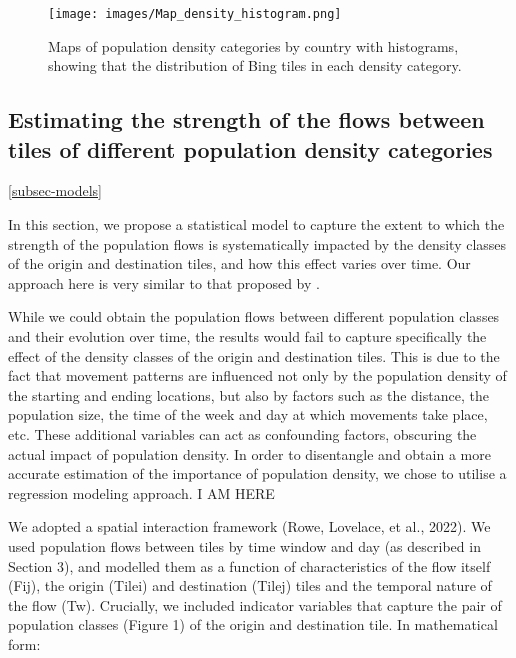\documentclass[11pt,letterpaper]{article}
\begin{document}
\begin{figure}

{\centering \texttt{[image: images/Map\_density\_histogram.png]}

}

\caption{Maps of population density categories by country with
histograms, showing that the distribution of Bing tiles in each density
category.}

\end{figure}

\subsection{Estimating the strength of the flows between tiles of different population density categories}

\ref{subsec-models}

In this section, we propose a statistical model to capture the extent to
which the strength of the population flows is systematically impacted by
the density classes of the origin and destination tiles, and how this
effect varies over time. Our approach here is very similar to that
proposed by \cite{Rowe}.

While we could obtain the population flows between different population
classes and their evolution over time, the results would fail to capture
specifically the effect of the density classes of the origin and
destination tiles. This is due to the fact that movement patterns are
influenced not only by the population density of the starting and ending
locations, but also by factors such as the distance, the population
size, the time of the week and day at which movements take place, etc.
These additional variables can act as confounding factors, obscuring the
actual impact of population density. In order to disentangle and obtain
a more accurate estimation of the importance of population density, we
chose to utilise a regression modeling approach. I AM HERE

We adopted a spatial interaction framework (Rowe, Lovelace, et al.,
2022). We used population flows between tiles by time window and day (as
described in Section 3), and modelled them as a function of
characteristics of the flow itself (Fij), the origin (Tilei) and
destination (Tilej) tiles and the temporal nature of the flow (Tw).
Crucially, we included indicator variables that capture the pair of
population classes (Figure 1) of the origin and destination tile. In
mathematical form:
\end{document}
